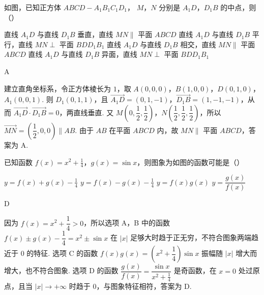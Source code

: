 \begin{problem}
如图，已知正方体
\(ABCD-A_{1}B_{1}C_{1}D_{1}\)，
\(M\)，\(N\) 分别是 \(A_{1}D\)，\(D_{1}B\) 的中点，则（\quad）


\choices
    {直线 \(A_{1}D\) 与直线 \(D_{1}B\) 垂直，直线 \(MN\parallel\) 平面 \(ABCD\)}
    {直线 \(A_{1}D\) 与直线 \(D_{1}B\) 平行，直线 \(MN\perp\) 平面 \(BDD_{1}B_{1}\)}
    {直线 \(A_{1}D\) 与直线 \(D_{1}B\) 相交，直线 \(MN\parallel\) 平面 \(ABCD\)}
    {直线 \(A_{1}D\) 与直线 \(D_{1}B\) 异面，直线 \(MN\perp\) 平面 \(BDD_{1}B_{1}\)}
\end{problem}

\begin{answer}
A
\end{answer}

\begin{solution}
建立直角坐标系，令正方体棱长为 \(1\)，取
\(A(0,0,0)\)，\(B(1,0,0)\)，\(D(0,1,0)\)，\(A_{1}(0,0,1)\). 则 \(D_{1}(0,1,1)\)，且
\(\overrightarrow{A_{1}D}=(0,1,-1)\)，\(\overrightarrow{D_{1}B}=(1,-1,-1)\)，从而 \(\overrightarrow{A_{1}D}\cdot\overrightarrow{D_{1}B}=0\)，两直线垂直. 又
\(M\left(0,\dfrac12,\dfrac12\right)\)，\(N\left(\dfrac12,\dfrac12,\dfrac12\right)\)，所以 \(\overrightarrow{MN}=\left(\dfrac12,0,0\right)\parallel AB\). 由于 \(AB\) 在平面 \(ABCD\) 内，故 \(MN\parallel\) 平面 \(ABCD\)，答案为 A.
\end{solution}

\begin{problem}
已知函数
\(f(x)=x^{2}+\frac{1}{4}\)，\(g(x)=\sin x\)，则图象为如图的函数可能是（\quad）


\choices
    {\(y=f(x)+g(x)-\frac{1}{4}\)}
    {\(y=f(x)-g(x)-\frac{1}{4}\)}
    {\(y=f(x)g(x)\)}
    {\(y=\dfrac{g(x)}{f(x)}\)}
\end{problem}

\begin{answer}
D
\end{answer}

\begin{solution}
因为 \(f(x)=x^{2}+\dfrac14>0\)，所以选项 A，B 中的函数 \(f(x)\pm g(x)-\dfrac14=x^{2}\pm\sin x\) 在 \(|x|\) 足够大时趋于正无穷，不符合图象两端趋近于 \(0\) 的特征. 选项 C 的函数 \(f(x)g(x)=\left(x^{2}+\dfrac14\right)\sin x\) 振幅随 \(|x|\) 增大而增大，也不符合图象. 选项 D 的函数 \(\dfrac{g(x)}{f(x)}=\dfrac{\sin x}{x^{2}+\frac14}\) 是奇函数，在 \(x=0\) 处过原点，且当 \(|x|\to+\infty\) 时趋于 \(0\)，与图象特征相符，答案为 D.
\end{solution}

